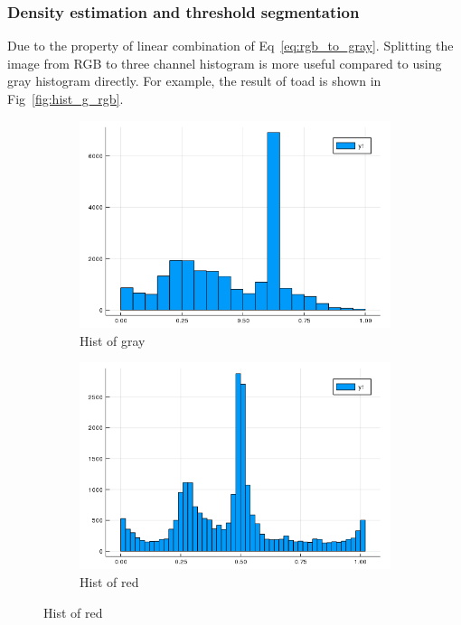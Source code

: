 \documentclass{beamer}
\begin{document}
\begin{frame}
  \frametitle{Density estimation and threshold segmentation}

  Due to the property of linear combination of Eq~\ref{eq:rgb_to_gray}. Splitting the image from RGB to three channel histogram is more useful
  compared to using gray histogram directly. For example, the result of toad is shown in Fig~\ref{fig:hist_g_rgb}.
  
  \begin{figure}[htb]
    \centering
    \begin{subfigure}[b]{0.24\linewidth}
      \includegraphics[width=\linewidth]{images/hist_gray.png}
      \caption{Hist of gray}
    \end{subfigure}
    \begin{subfigure}[b]{0.24\linewidth}
      \includegraphics[width=\linewidth]{images/hist_r.png}
      \caption{Hist of red}

\end{subfigure}
\end{figure}
\end{frame}
\end{document}
